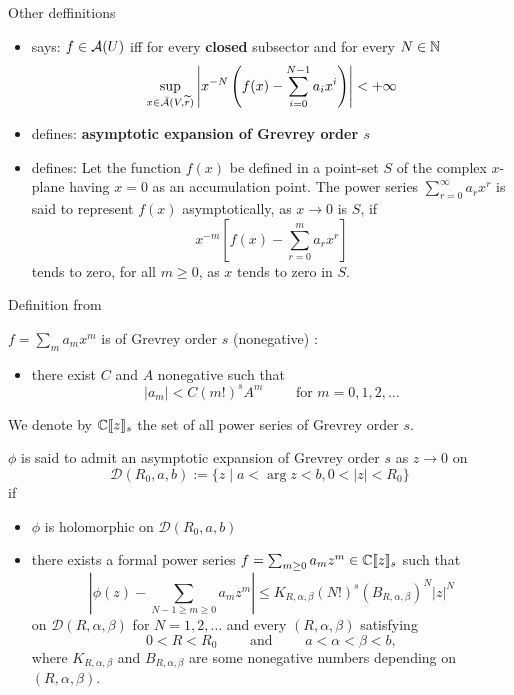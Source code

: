 \begin{frame}{Other deffinitions}
  \begin{itemize}
    \item \cite[2]{majima1984asymptotic} says:
      $f\in\mathcal{A}(U)$ iff for every \textbf{closed} subsector and for every
      $N\in\mathbb{N}$
      \[
        \sup_{x\in\bar{\mathcal{A}}(V,\widetilde r)}
          \left|x^{-N}\left(f(x)-\sum_{i=0}^{N-1}a_ix^i\right)\right|
        <+\infty
      \]
    \item \cite{zbMATH00060600} defines:
      \textbf{asymptotic expansion of Grevrey order $s$}
    \item \cite{wasow2002asymptotic} defines:
      Let the function $f(x)$ be defined in a point-set $S$ of the complex
      $x$-plane having $x=0$ as an accumulation point. The power series
      $\sum_{r=0}^\infty a_rx^r$ is said to represent $f(x)$ asymptotically, as
      $x\to0$ is $S$, if
      \[
        x^{-m}\left[f(x)-\sum_{r=0}^ma_rx^r\right]
      \]
      tends to zero, for all $m\geq0$, as $x$ tends to zero in $S$.
  \end{itemize}
\end{frame}

\begin{frame}{Definition from \cite{zbMATH00060600}}
\begin{defn}
  $f=\sum_ma_mx^m$ is of Grevrey order $s$ (nonegative) :\Leftrightarrow
  \begin{itemize}
    \item there exist $C$ and $A$ nonegative such that
    \[
      |a_m|< C(m!)^sA^m \qquad \text{ for } m=0,1,2,\dots
    \]
  \end{itemize}
  We denote by $\mathbb{C}\llbracket z\rrbracket_s$ the set of all power series of
  Grevrey order $s$.
\end{defn}
\begin{defn}
$\phi$ is said to admit an asymptotic expansion of Grevrey order $s$ as $z\to0$
on
\[
  \mathcal{D}(R_0,a,b):=\{z \mid a < \arg z < b , 0 < |z| < R_0\}
\]
if
\begin{itemize}
  \item $\phi$ is holomorphic on $\mathcal{D}(R_0,a,b)$
  \item there exists a formal power series
  $f=\sum_{m\geq0}a_mz^m \in \mathbb{C}\llbracket z\rrbracket_s$ such that
  \[
    \left|\phi(z)-\sum_{N-1\geq m\geq 0}a_mz^m\right|
    \leq K_{R,\alpha,\beta}(N!)^s(B_{R,\alpha,\beta})^N|z|^N
  \]
  on $\mathcal{D}(R,\alpha,\beta)$ for $N=1,2,\dots$ and every
  $(R,\alpha,\beta)$ satisfying
  \[
    0 < R < R_0 \qquad \text{ and } \qquad a < \alpha < \beta < b,
  \]
  where $K_{R,\alpha,\beta}$ and $B_{R,\alpha,\beta}$ are some nonegative
  numbers depending on $(R,\alpha,\beta)$.
\end{itemize}
\end{defn}
\end{frame}

